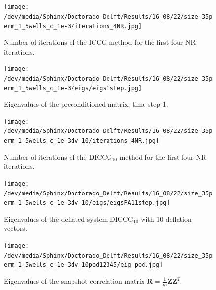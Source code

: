 \documentclass[12pt]{article}
\begin{document}
\begin{figure}[!h]
\centering
\begin{minipage}{.4\textwidth}
 \centering
\texttt{[image: /dev/media/Sphinx/Doctorado\_Delft/Results/16\_08/22/size\_35perm\_1\_5wells\_c\_1e-3/iterations\_4NR.jpg]}
\caption{Number of iterations of the ICCG method for the first four NR iterations.}
\label{fig:NR_IC}
\end{minipage}%
\hspace{15mm}
\begin{minipage}{.4\textwidth}
 \centering
 \vspace{-5mm}
\texttt{[image: /dev/media/Sphinx/Doctorado\_Delft/Results/16\_08/22/size\_35perm\_1\_5wells\_c\_1e-3/eigs/eigs1step.jpg]}
\caption{Eigenvalues of the preconditioned matrix, time step 1.}
\label{fig:eigs_MA}
\end{minipage}
\end{figure}

\begin{figure}[!h]
\centering
\begin{minipage}{.4\textwidth}
 \centering
\texttt{[image: /dev/media/Sphinx/Doctorado\_Delft/Results/16\_08/22/size\_35perm\_1\_5wells\_c\_1e-3dv\_10/iterations\_4NR.jpg]}
\caption{Number of iterations of the DICCG$_{10}$ method for the first four NR iterations.}
\label{fig:NR_D10}
\end{minipage}%
\hspace{15mm}
\begin{minipage}{.4\textwidth}
 \centering
\texttt{[image: /dev/media/Sphinx/Doctorado\_Delft/Results/16\_08/22/size\_35perm\_1\_5wells\_c\_1e-3dv\_10/eigs/eigsPA11step.jpg]}
\caption{Eigenvalues of the deflated system DICCG$_{10}$ with 10 deflation vectors.}
\label{fig:eigs_PA}
\end{minipage}
\end{figure}


\begin{figure}[!h]
\centering
\begin{minipage}{.4\textwidth}
 \centering
\texttt{[image: /dev/media/Sphinx/Doctorado\_Delft/Results/16\_08/22/size\_35perm\_1\_5wells\_c\_1e-3dv\_10pod12345/eig\_pod.jpg]}
\caption{Eigenvalues of the snapshot correlation matrix $\mathbf{R}=\frac{1}{m}\mathbf{Z}\mathbf{Z}^T$.}
\label{fig:eig_POD}
\end{minipage}
\end{figure}
\end{document}
